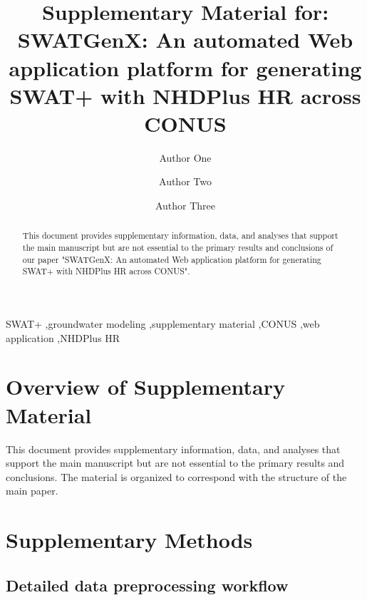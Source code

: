 \documentclass[preprint,12pt]{elsarticle}
\begin{document}
\begin{frontmatter}

\title{Supplementary Material for: SWATGenX: An automated Web application platform for generating SWAT+ with NHDPlus HR across CONUS}

\author[1]{Author One}
\author[2]{Author Two}
\author[1,3]{Author Three}
\address[1]{Department, University, City, State/Province, Country}
\address[2]{Department, University, City, State/Province, Country}
\address[3]{Department, University, City, State/Province, Country}

\begin{abstract}
This document provides supplementary information, data, and analyses that support the main manuscript but are not essential to the primary results and conclusions of our paper "SWATGenX: An automated Web application platform for generating SWAT+ with NHDPlus HR across CONUS".
\end{abstract}

\begin{keyword}
SWAT+ \sep groundwater modeling \sep supplementary material \sep CONUS \sep web application \sep NHDPlus HR
\end{keyword}

\end{frontmatter}


\section*{Overview of Supplementary Material}
\label{sec:overview}
This document provides supplementary information, data, and analyses that support the main manuscript but are not essential to the primary results and conclusions. The material is organized to correspond with the structure of the main paper.

\section{Supplementary Methods}
\label{sec:suppl_methods}

\subsection{Detailed data preprocessing workflow}
\label{subsec:preprocessing}
\end{document}
